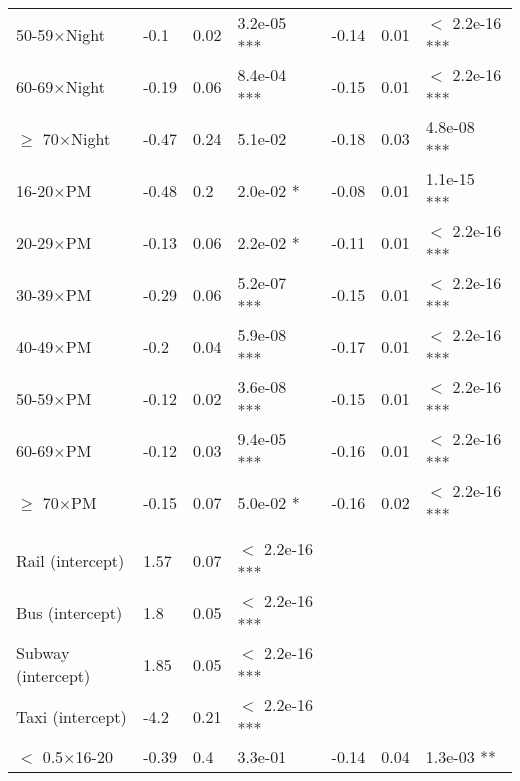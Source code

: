 \documentclass{article}\usepackage[utf8]{inputenc}
\begin{document}
\begin{longtable}[t]{lllllll}
\hspace{1em}50-59$\times$Night & -0.1 & 0.02 & 3.2e-05 *** & -0.14 & 0.01 & $<$ 2.2e-16 ***\\
\hspace{1em}60-69$\times$Night & -0.19 & 0.06 & 8.4e-04 *** & -0.15 & 0.01 & $<$ 2.2e-16 ***\\
\hspace{1em}$\geq$ 70$\times$Night & -0.47 & 0.24 & 5.1e-02 & -0.18 & 0.03 & 4.8e-08 ***\\
\hspace{1em}16-20$\times$PM & -0.48 & 0.2 & 2.0e-02 * & -0.08 & 0.01 & 1.1e-15 ***\\
\hspace{1em}20-29$\times$PM & -0.13 & 0.06 & 2.2e-02 * & -0.11 & 0.01 & $<$ 2.2e-16 ***\\
\hspace{1em}30-39$\times$PM & -0.29 & 0.06 & 5.2e-07 *** & -0.15 & 0.01 & $<$ 2.2e-16 ***\\
\hspace{1em}40-49$\times$PM & -0.2 & 0.04 & 5.9e-08 *** & -0.17 & 0.01 & $<$ 2.2e-16 ***\\
\hspace{1em}50-59$\times$PM & -0.12 & 0.02 & 3.6e-08 *** & -0.15 & 0.01 & $<$ 2.2e-16 ***\\
\hspace{1em}60-69$\times$PM & -0.12 & 0.03 & 9.4e-05 *** & -0.16 & 0.01 & $<$ 2.2e-16 ***\\
\hspace{1em}$\geq$ 70$\times$PM & -0.15 & 0.07 & 5.0e-02 * & -0.16 & 0.02 & $<$ 2.2e-16 ***\\
\addlinespace[0.3em]
\multicolumn{7}{l}{\textbf{Distance$\times$Age, McFadden $R^2 = 0.57$}}\\
\hline
\hspace{1em}Rail (intercept) & 1.57 & 0.07 & $<$ 2.2e-16 *** &  &  & \\
\hspace{1em}Bus (intercept) & 1.8 & 0.05 & $<$ 2.2e-16 *** &  &  & \\
\hspace{1em}Subway (intercept) & 1.85 & 0.05 & $<$ 2.2e-16 *** &  &  & \\
\hspace{1em}Taxi (intercept) & -4.2 & 0.21 & $<$ 2.2e-16 *** &  &  & \\
\hspace{1em}$<$ 0.5$\times$16-20 & -0.39 & 0.4 & 3.3e-01 & -0.14 & 0.04 & 1.3e-03 **\\

\end{longtable}
\end{document}
